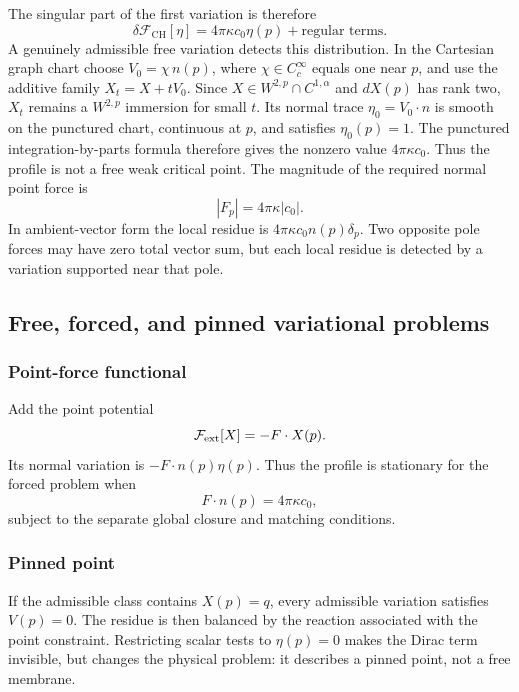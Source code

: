 \documentclass[preprint,amsmath,amssymb,aps,prl,superscriptaddress,nofootinbib,floatfix]{revtex4-2}
\newcommand{\CH}{\mathrm{CH}}
\begin{document}
The singular part of the first variation is therefore
\begin{equation}
\delta\mathcal F_{\CH}[\eta]=4\pi\kappa c_0\eta(p)+\text{regular terms}.\label{eq:variationresidue}
\end{equation}
A genuinely admissible free variation detects this distribution. In the Cartesian graph chart choose \(V_0=\chi\,n(p)\), where \(\chi\in C_c^\infty\) equals one near \(p\), and use the additive family \(X_t=X+tV_0\). Since \(X\in W^{2,p}\cap C^{1,\alpha}\) and \(dX(p)\) has rank two, \(X_t\) remains a \(W^{2,p}\) immersion for small \(t\). Its normal trace \(\eta_0=V_0\cdot n\) is smooth on the punctured chart, continuous at \(p\), and satisfies \(\eta_0(p)=1\). The punctured integration-by-parts formula therefore gives the nonzero value \(4\pi\kappa c_0\). Thus the profile is not a free weak critical point. The magnitude of the required normal point force is
\begin{equation}
|F_p|=4\pi\kappa|c_0|.\label{eq:force}
\end{equation}
In ambient-vector form the local residue is \(4\pi\kappa c_0n(p)\delta_p\). Two opposite pole forces may have zero total vector sum, but each local residue is detected by a variation supported near that pole.

\subsection{Free, forced, and pinned variational problems}\label{sec:models}

\subsubsection{Point-force functional}
Add the point potential
\begin{equation}
\mathcal F_{\rm ext}[X]=-F\cdot X(p).\label{eq:pointpotential}
\end{equation}
Its normal variation is \(-F\cdot n(p)\eta(p)\). Thus the profile is stationary for the forced problem when
\begin{equation}
F\cdot n(p)=4\pi\kappa c_0,\label{eq:forcebalance}
\end{equation}
subject to the separate global closure and matching conditions.

\subsubsection{Pinned point}
If the admissible class contains \(X(p)=q\), every admissible variation satisfies \(V(p)=0\). The residue is then balanced by the reaction associated with the point constraint. Restricting scalar tests to \(\eta(p)=0\) makes the Dirac term invisible, but changes the physical problem: it describes a pinned point, not a free membrane.
\end{document}
